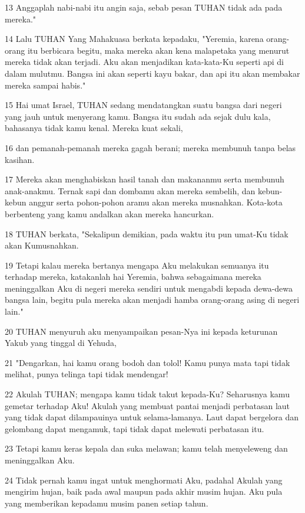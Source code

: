 \par 13 Anggaplah nabi-nabi itu angin saja, sebab pesan TUHAN tidak ada pada mereka."
\par 14 Lalu TUHAN Yang Mahakuasa berkata kepadaku, "Yeremia, karena orang-orang itu berbicara begitu, maka mereka akan kena malapetaka yang menurut mereka tidak akan terjadi. Aku akan menjadikan kata-kata-Ku seperti api di dalam mulutmu. Bangsa ini akan seperti kayu bakar, dan api itu akan membakar mereka sampai habis."
\par 15 Hai umat Israel, TUHAN sedang mendatangkan suatu bangsa dari negeri yang jauh untuk menyerang kamu. Bangsa itu sudah ada sejak dulu kala, bahasanya tidak kamu kenal. Mereka kuat sekali,
\par 16 dan pemanah-pemanah mereka gagah berani; mereka membunuh tanpa belas kasihan.
\par 17 Mereka akan menghabiskan hasil tanah dan makananmu serta membunuh anak-anakmu. Ternak sapi dan dombamu akan mereka sembelih, dan kebun-kebun anggur serta pohon-pohon aramu akan mereka musnahkan. Kota-kota berbenteng yang kamu andalkan akan mereka hancurkan.
\par 18 TUHAN berkata, "Sekalipun demikian, pada waktu itu pun umat-Ku tidak akan Kumusnahkan.
\par 19 Tetapi kalau mereka bertanya mengapa Aku melakukan semuanya itu terhadap mereka, katakanlah hai Yeremia, bahwa sebagaimana mereka meninggalkan Aku di negeri mereka sendiri untuk mengabdi kepada dewa-dewa bangsa lain, begitu pula mereka akan menjadi hamba orang-orang asing di negeri lain."
\par 20 TUHAN menyuruh aku menyampaikan pesan-Nya ini kepada keturunan Yakub yang tinggal di Yehuda,
\par 21 "Dengarkan, hai kamu orang bodoh dan tolol! Kamu punya mata tapi tidak melihat, punya telinga tapi tidak mendengar!
\par 22 Akulah TUHAN; mengapa kamu tidak takut kepada-Ku? Seharusnya kamu gemetar terhadap Aku! Akulah yang membuat pantai menjadi perbatasan laut yang tidak dapat dilampauinya untuk selama-lamanya. Laut dapat bergelora dan gelombang dapat mengamuk, tapi tidak dapat melewati perbatasan itu.
\par 23 Tetapi kamu keras kepala dan suka melawan; kamu telah menyeleweng dan meninggalkan Aku.
\par 24 Tidak pernah kamu ingat untuk menghormati Aku, padahal Akulah yang mengirim hujan, baik pada awal maupun pada akhir musim hujan. Aku pula yang memberikan kepadamu musim panen setiap tahun.
